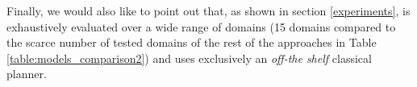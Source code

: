 Finally, we would also like to point out that, as shown in section \ref{experiments}, \FAMA is exhaustively evaluated over a wide range of domains (15 domains compared to the scarce number of tested domains of the rest of the approaches in Table \ref{table:models_comparison2}) and uses exclusively an \emph{off-the shelf} classical planner.




























